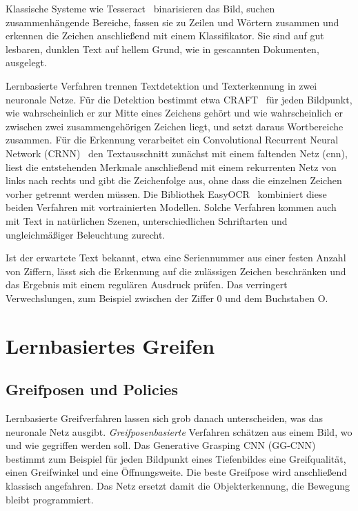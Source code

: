 Klassische Systeme wie Tesseract~\cite{smith2007} binarisieren das Bild, suchen
zusammenhängende Bereiche, fassen sie zu Zeilen und Wörtern zusammen und erkennen die Zeichen
anschließend mit einem Klassifikator. Sie sind auf gut lesbaren, dunklen Text auf hellem
Grund, wie in gescannten Dokumenten, ausgelegt.

Lernbasierte Verfahren trennen Textdetektion und Texterkennung in zwei neuronale Netze. Für
die Detektion bestimmt etwa CRAFT~\cite{baek2019} für jeden Bildpunkt, wie wahrscheinlich er
zur Mitte eines Zeichens gehört und wie wahrscheinlich er zwischen zwei zusammengehörigen
Zeichen liegt, und setzt daraus Wortbereiche zusammen. Für die Erkennung verarbeitet ein
Convolutional Recurrent Neural Network (CRNN)~\cite{shi2017} den Textausschnitt zunächst mit
einem faltenden Netz (\ac{cnn}), liest die entstehenden Merkmale anschließend mit einem
rekurrenten Netz von links nach rechts und gibt die Zeichenfolge aus, ohne dass die einzelnen
Zeichen vorher getrennt werden müssen. Die Bibliothek EasyOCR~\cite{easyocr} kombiniert diese
beiden Verfahren mit vortrainierten Modellen. Solche Verfahren kommen auch mit Text in
natürlichen Szenen, unterschiedlichen Schriftarten und ungleichmäßiger Beleuchtung zurecht.

Ist der erwartete Text bekannt, etwa eine Seriennummer aus einer festen Anzahl von Ziffern,
lässt sich die Erkennung auf die zulässigen Zeichen beschränken und das Ergebnis mit einem
regulären Ausdruck prüfen. Das verringert Verwechslungen, zum Beispiel zwischen der Ziffer 0
und dem Buchstaben O.

\section{Lernbasiertes Greifen}
\label{sec:ki-greifen-grundlagen}

\subsection{Greifposen und Policies}

Lernbasierte Greifverfahren lassen sich grob danach unterscheiden, was das neuronale Netz
ausgibt. \emph{Greifposenbasierte} Verfahren schätzen aus einem Bild, wo und wie gegriffen
werden soll. Das Generative Grasping CNN (GG-CNN)~\cite{morrison2018} bestimmt zum Beispiel
für jeden Bildpunkt eines Tiefenbildes eine Greifqualität, einen Greifwinkel und eine
Öffnungsweite. Die beste Greifpose wird anschließend klassisch angefahren. Das Netz ersetzt
damit die Objekterkennung, die Bewegung bleibt programmiert.

